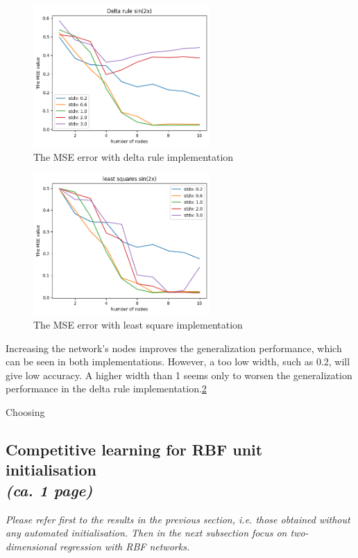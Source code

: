 \documentclass[a4paper]{article}
\begin{document}
\begin{figure} 
     \centering
     \includegraphics[width=0.6\textwidth]{Labs/Lab 2/figures/3.2/MSE_sin(2x)_delta.png}
     \caption{The MSE error with delta rule implementation}
     \label{fig:sin(2x)}
\end{figure}

\begin{figure} 
     \centering
     \includegraphics[width=0.6\textwidth]{Labs/Lab 2/figures/3.2/MSE_sin(2x)_least.png}
     \caption{The MSE error with least square implementation}
     \label{fig:sin(2x)}
\end{figure}

Increasing the network's nodes improves the generalization performance, which can be seen in both implementations. However, a too low width, such as 0.2, will give low accuracy.
A higher width than 1 seems only to worsen the generalization performance in the delta rule implementation.\ref{fig:sin(2x)} 


Choosing 





\subsection{Competitive learning for RBF unit initialisation\\ \normalsize{\textit{(ca. 1 page)}}}
\textit{Please refer first to the results in the previous section, i.e. those obtained without any automated initialisation. Then in the next subsection focus on two-dimensional regression with RBF networks.}
\end{document}
